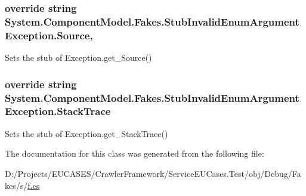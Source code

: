 \hypertarget{class_system_1_1_component_model_1_1_fakes_1_1_stub_invalid_enum_argument_exception_ad0679e9d206d9aa56fbcbde42ea32dd1}{
\subsubsection[{Source}]{\setlength{\rightskip}{0pt plus 5cm}override string System.\-Component\-Model.\-Fakes.\-Stub\-Invalid\-Enum\-Argument\-Exception.\-Source\hspace{0.3cm}{\ttfamily [get]}, {\ttfamily [set]}}}\label{class_system_1_1_component_model_1_1_fakes_1_1_stub_invalid_enum_argument_exception_ad0679e9d206d9aa56fbcbde42ea32dd1}


Sets the stub of Exception.\-get\-\_\-\-Source()

\hypertarget{class_system_1_1_component_model_1_1_fakes_1_1_stub_invalid_enum_argument_exception_a1f1325a78c7a45e9368189569d47f985}{
\subsubsection[{Stack\-Trace}]{\setlength{\rightskip}{0pt plus 5cm}override string System.\-Component\-Model.\-Fakes.\-Stub\-Invalid\-Enum\-Argument\-Exception.\-Stack\-Trace\hspace{0.3cm}{\ttfamily [get]}}}\label{class_system_1_1_component_model_1_1_fakes_1_1_stub_invalid_enum_argument_exception_a1f1325a78c7a45e9368189569d47f985}


Sets the stub of Exception.\-get\-\_\-\-Stack\-Trace()



The documentation for this class was generated from the following file\-:\begin{DoxyCompactItemize}
\item 
D\-:/\-Projects/\-E\-U\-C\-A\-S\-E\-S/\-Crawler\-Framework/\-Service\-E\-U\-Cases.\-Test/obj/\-Debug/\-Fakes/s/\hyperlink{s_2f_8cs}{f.\-cs}\end{DoxyCompactItemize}
